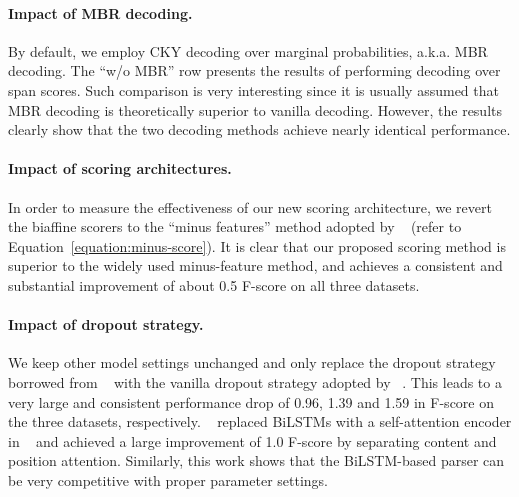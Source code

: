 \documentclass{article}
\begin{document}
\paragraph{Impact of MBR decoding.}
By default, we employ CKY decoding over marginal probabilities, a.k.a. MBR decoding.
The ``w/o MBR'' row presents the results of performing decoding over span scores.
Such comparison is very interesting since it is usually assumed that MBR decoding is theoretically superior to vanilla decoding.
However, the results clearly show that
the two decoding methods achieve nearly identical performance.


\paragraph{Impact of scoring architectures.}
In order to measure the effectiveness of our new scoring architecture, we revert the biaffine scorers to the ``minus features'' method adopted by \citeauthor{stern-etal-2017-minimal}~ (refer to Equation~\ref{equation:minus-score}).
It is clear that our proposed scoring method is superior to the widely used minus-feature method, and
achieves a consistent and substantial improvement of about 0.5 F-score on all three datasets.


\paragraph{Impact of dropout strategy.}
We keep other model settings unchanged and only replace the dropout strategy borrowed from \citeauthor{Timothy-d17-biaffine}~ with the vanilla dropout strategy adopted by \citeauthor{stern-etal-2017-minimal}~.
This leads to a very large and consistent performance drop of 0.96, 1.39 and 1.59 in F-score on the three datasets, respectively.
\citeauthor{kitaev-klein-2018-constituency}~ replaced BiLSTMs with a self-attention encoder in \citeauthor{stern-etal-2017-minimal}~ and achieved a large improvement of 1.0 F-score by separating content and position attention.
Similarly, this work shows that the BiLSTM-based parser can be very competitive with proper parameter settings.
\end{document}
